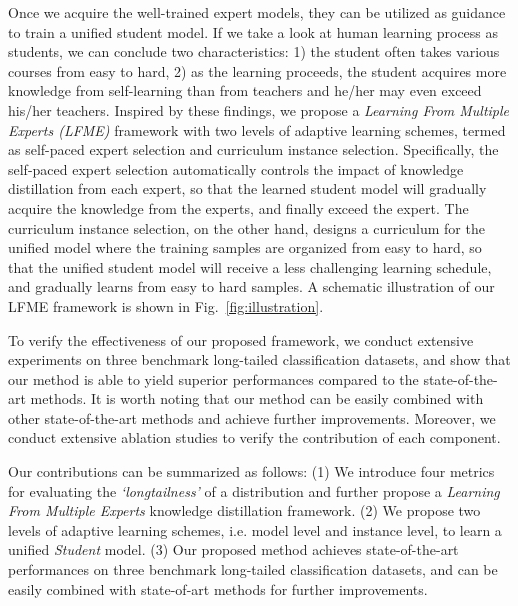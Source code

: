 \documentclass[runningheads]{llncs}
\begin{document}
	Once we acquire the well-trained expert models,  they can be utilized as guidance to train a unified student model. If we take a look at human learning process as students, we can conclude two characteristics: 1) the student often takes various courses from easy to hard, 2) as the learning proceeds, the student acquires more knowledge from self-learning than from teachers and he/her may even exceed his/her teachers. Inspired by these findings,
we propose a \emph{Learning From Multiple Experts (LFME)} framework with two levels of adaptive learning schemes, termed as self-paced expert selection and curriculum instance selection. Specifically, the self-paced expert selection automatically controls the impact of knowledge distillation from each expert, so that the learned student model will gradually acquire the knowledge from the experts, and finally exceed the expert. The curriculum instance selection, on the other hand, designs a curriculum for the unified model where the training samples are organized from easy to hard, so that the unified student model will receive a less challenging learning schedule, and gradually learns from easy to hard samples. 
	A schematic illustration of our LFME framework is shown in Fig.~\ref{fig:illustration}.
	
	To verify the effectiveness of our proposed framework, we conduct extensive experiments on three benchmark long-tailed classification datasets, and show that our method is able to yield superior performances compared to the state-of-the-art methods. It is worth noting that our method can be easily combined with other state-of-the-art methods and achieve further improvements. Moreover, we conduct extensive ablation studies to verify the contribution of each component. 
	
	Our contributions can be summarized as follows: 
	(1) We introduce four metrics for evaluating the \textit{`longtailness'} of a distribution and further propose a \emph{Learning From Multiple Experts} knowledge distillation framework.
	(2) We propose two levels of adaptive learning schemes, i.e. model level and instance level, to learn a unified \emph{Student} model. (3) Our proposed method achieves state-of-the-art performances on three benchmark long-tailed classification datasets, and can be easily combined with state-of-art methods for further improvements.


	
\end{document}
